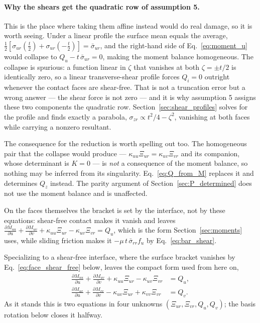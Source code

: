 \documentclass[11pt]{article}
\begin{document}
\medskip
\paragraph{Why the shears get the quadratic row of assumption 5.} This is the
place where taking them affine instead would do real damage, so it is worth
seeing. Under a linear profile the surface mean equals the average,
$\tfrac12\left[\sigma_{ur}(\tfrac t2)+\sigma_{ur}(-\tfrac t2)\right]
= \bar\sigma_{ur}$, and the right-hand side of Eq.~\eqref{eq:moment_u} would
collapse to $Q_u - t\,\bar\sigma_{ur} = 0$, making the moment balance
homogeneous. The collapse is spurious: a function linear in $\zeta$ that
vanishes at both $\zeta = \pm t/2$ is identically zero, so a linear
transverse-shear profile forces $Q_i = 0$ outright whenever the contact faces are
shear-free. That is not a truncation error but a wrong answer --- the shear force
is not zero --- and it is why assumption 5 assigns these two components the
quadratic row. Section~\ref{sec:shear_profiles} solves for the profile and finds
exactly a parabola, $\sigma_{zr} \propto t^{2}/4 - \zeta^{2}$, vanishing at both
faces while carrying a nonzero resultant.

The consequence for the reduction is worth spelling out too. The homogeneous pair
that the collapse would produce ---
$\kappa_{uu}\Xi_{ur} = \kappa_{uv}\Xi_{vr}$ and its companion, whose determinant
is $K = 0$ --- is \emph{not} a consequence of the moment balance, so nothing may
be inferred from its singularity. Eq.~\eqref{eq:Q_from_M} replaces it and
determines $Q_z$ instead. The parity argument of
Section~\ref{sec:P_determined} does not use the moment balance and is unaffected.

On the faces themselves the bracket is set by the interface, not by these
equations: shear-free contact makes it vanish and leaves
$\frac{\partial M_{uu}}{\partial u} + \frac{\partial M_{uv}}{\partial v}
+ \kappa_{uu}\Xi_{ur} - \kappa_{uv}\Xi_{vr} = Q_u$, which is the form
Section~\ref{sec:moments} uses, while sliding friction makes it
$-\mu\,t\,\bar\sigma_{rr}f_u$ by Eq.~\eqref{eq:bar_shear}.



Specializing to a shear-free interface, where the surface bracket vanishes by
Eq.~\eqref{eq:face_shear_free} below, leaves the compact form used from here on,
\begin{equation}\label{eq:moment_with_Q}
    \boxed{\;
    \begin{aligned}
    \frac{\partial M_{uu}}{\partial u} + \frac{\partial M_{uv}}{\partial v}
      + \kappa_{uu}\Xi_{ur} - \kappa_{uv}\Xi_{vr} &= Q_u,\\
    \frac{\partial M_{uv}}{\partial u} + \frac{\partial M_{vv}}{\partial v}
      - \kappa_{uv}\Xi_{ur} + \kappa_{vv}\Xi_{vr} &= Q_v.
    \end{aligned}\;}
\end{equation}
As it stands this is two equations in four unknowns
$\left(\Xi_{ur},\Xi_{vr},Q_u,Q_v\right)$; the basis rotation below closes it
halfway.
\end{document}
